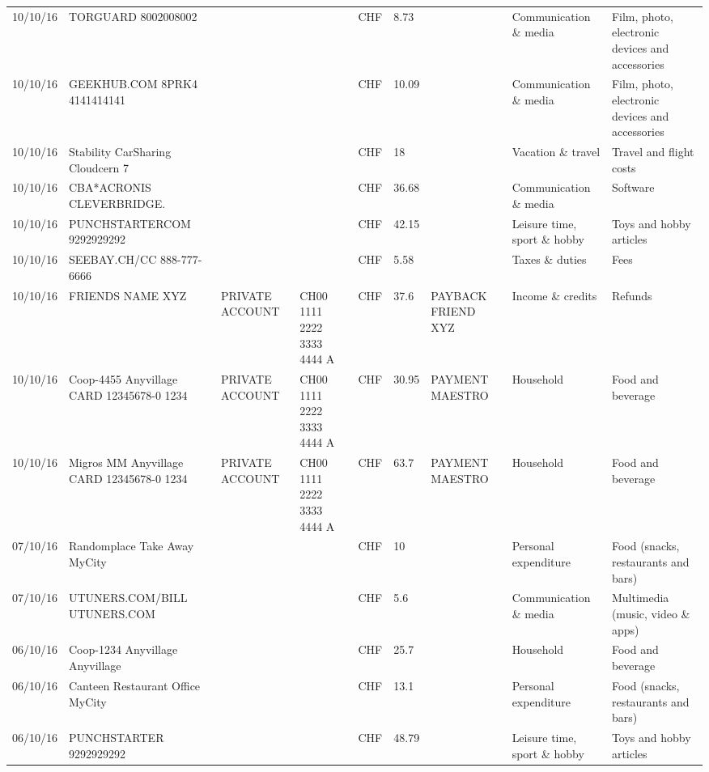 \begin{landscape}
\begin{table}[t]
\begin{center}
\begin{tabular}{lllllllll}
		10/10/16 & TORGUARD                 8002008002 &       &       & CHF   & 8.73  &       & Communication \& media & Film, photo, electronic devices and accessories \\
		10/10/16 & GEEKHUB.COM  8PRK4        4141414141 &       &       & CHF   & 10.09 &       & Communication \& media & Film, photo, electronic devices and accessories \\
		10/10/16 & Stability CarSharing      Cloudcern 7 &       &       & CHF   & 18    &       & Vacation \& travel & Travel and flight costs \\
		10/10/16 & CBA*ACRONIS              CLEVERBRIDGE. &       &       & CHF   & 36.68 &       & Communication \& media & Software \\
		10/10/16 & PUNCHSTARTERCOM           9292929292 &       &       & CHF   & 42.15 &       & Leisure time, sport \& hobby & Toys and hobby articles \\
		10/10/16 & SEEBAY.CH/CC               888-777-6666 &       &       & CHF   & 5.58  &       & Taxes \& duties & Fees \\
		10/10/16 & FRIENDS NAME XYZ & PRIVATE ACCOUNT & CH00 1111 2222 3333 4444 A & CHF   & 37.6  & PAYBACK FRIEND XYZ & Income \& credits & Refunds \\
		10/10/16 & Coop-4455 Anyvillage CARD 12345678-0 1234 & PRIVATE ACCOUNT & CH00 1111 2222 3333 4444 A & CHF   & 30.95 & PAYMENT MAESTRO & Household & Food and beverage \\
		10/10/16 & Migros MM Anyvillage CARD 12345678-0 1234 & PRIVATE ACCOUNT & CH00 1111 2222 3333 4444 A & CHF   & 63.7  & PAYMENT MAESTRO & Household & Food and beverage \\
		07/10/16 & Randomplace Take Away     MyCity &       &       & CHF   & 10    &       & Personal expenditure & Food (snacks, restaurants and bars) \\
		07/10/16 & UTUNERS.COM/BILL          UTUNERS.COM &       &       & CHF   & 5.6   &       & Communication \& media & Multimedia (music, video \& apps) \\
		06/10/16 & Coop-1234 Anyvillage    Anyvillage &       &       & CHF   & 25.7  &       & Household & Food and beverage \\
		06/10/16 & Canteen Restaurant Office      MyCity &       &       & CHF   & 13.1  &       & Personal expenditure & Food (snacks, restaurants and bars) \\
		06/10/16 & PUNCHSTARTER     9292929292 &       &       & CHF   & 48.79 &       & Leisure time, sport \& hobby & Toys and hobby articles \\

\end{tabular}
\end{center}
\end{table}
\end{landscape}
